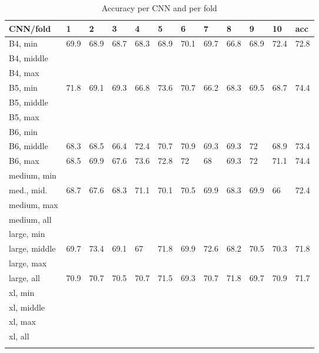 \documentclass[10pt,letterpaper]{article}
\begin{document}
\begin{table}[!ht]
    \centering
    \caption{Accuracy per CNN and per fold}
    \begin{tabular}{|l|l|l|l|l|l|l|l|l|l|l|l|}
    \hline
        CNN/fold & 1 & 2 & 3 & 4 & 5 & 6 & 7 & 8 & 9 & 10 & acc \\ \hline
        B4, min & 69.9 & 68.9 & 68.7 & 68.3 & 68.9 & 70.1 & 69.7 & 66.8 & 68.9 & 72.4 & 72.8 \\ \hline
        B4, middle & ~ & ~ & ~ & ~ & ~ & ~ & ~ & ~ & ~ & ~ & ~ \\ \hline
        B4, max & ~ & ~ & ~ & ~ & ~ & ~ & ~ & ~ & ~ & ~ & ~ \\ \hline
        B5, min & 71.8 & 69.1 & 69.3 & 66.8 & 73.6 & 70.7 & 66.2 & 68.3 & 69.5 & 68.7 & 74.4 \\ \hline
        B5, middle & ~ & ~ & ~ & ~ & ~ & ~ & ~ & ~ & ~ & ~ & ~ \\ \hline
        B5, max & ~ & ~ & ~ & ~ & ~ & ~ & ~ & ~ & ~ & ~ & ~ \\ \hline
        B6, min & ~ & ~ & ~ & ~ & ~ & ~ & ~ & ~ & ~ & ~ & ~ \\ \hline
        B6, middle & 68.3 & 68.5 & 66.4 & 72.4 & 70.7 & 70.9 & 69.3 & 69.3 & 72 & 68.9 & 73.4 \\ \hline
        B6, max & 68.5 & 69.9 & 67.6 & 73.6 & 72.8 & 72 & 68 & 69.3 & 72 & 71.1 & 74.4 \\ \hline
        medium, min & ~ & ~ & ~ & ~ & ~ & ~ & ~ & ~ & ~ & ~ & ~ \\ \hline
        med., mid. & 68.7 & 67.6 & 68.3 & 71.1 & 70.1 & 70.5 & 69.9 & 68.3 & 69.9 & 66 & 72.4 \\ \hline
        medium, max & ~ & ~ & ~ & ~ & ~ & ~ & ~ & ~ & ~ & ~ & ~ \\ \hline
        medium, all & ~ & ~ & ~ & ~ & ~ & ~ & ~ & ~ & ~ & ~ & ~ \\ \hline
        large, min & ~ & ~ & ~ & ~ & ~ & ~ & ~ & ~ & ~ & ~ & ~ \\ \hline
        large, middle & 69.7 & 73.4 & 69.1 & 67 & 71.8 & 69.9 & 72.6 & 68.2 & 70.5 & 70.3 & 71.8 \\ \hline
        large, max & ~ & ~ & ~ & ~ & ~ & ~ & ~ & ~ & ~ & ~ & ~ \\ \hline
        large, all & 70.9 & 70.7 & 70.5 & 70.7 & 71.5 & 69.3 & 70.7 & 71.8 & 69.7 & 70.9 & 71.7 \\ \hline
        xl, min & ~ & ~ & ~ & ~ & ~ & ~ & ~ & ~ & ~ & ~ & ~ \\ \hline
        xl, middle & ~ & ~ & ~ & ~ & ~ & ~ & ~ & ~ & ~ & ~ & ~ \\ \hline
        xl, max & ~ & ~ & ~ & ~ & ~ & ~ & ~ & ~ & ~ & ~ & ~ \\ \hline
        xl, all & ~ & ~ & ~ & ~ & ~ & ~ & ~ & ~ & ~ & ~ & ~ \\ \hline
    \label{table4}
    \end{tabular}
\end{table}
\end{document}
